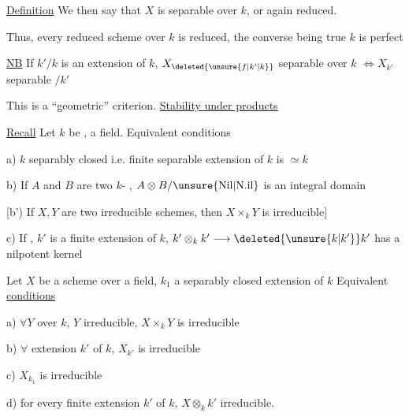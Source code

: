 \uline{Definition} We then say that $X$ is separable over $k$, or again   reduced.

Thus,  every  reduced scheme over $k$ is  reduced, the converse being true  $k$ is perfect

\uline{NB} If $k'/k$ is an extension of $k$, $X_{\deleted{\unsure{f|k'|k}}}$ separable over $k$ $\Longleftrightarrow X_{k'}$ separable $/k'$

This is a ``geometric'' criterion. \hfill\uline{Stability under products}


\uline{Recall} Let $k$ be , a field. Equivalent conditions

a) $k$ separably closed i.e.  finite separable extension of $k$ is $\simeq k$

b) If $A$ and $B$ are two $k$- , $A\otimes B/\mathrm{\unsure{Nil|N.il}}$ is an integral domain

[b') If $X,Y$ are two irreducible schemes, then $X\times_k Y$ is irreducible]

c) If , $k'$ is a finite extension of $k$, $k'\otimes_k k'\longrightarrow\deleted{\unsure{k|k'}}k'$ has a nilpotent kernel


Let $X$ be a scheme over a field, $k_1$ a separably closed extension of $k$ Equivalent \uline{conditions}

a) $\forall Y$ over $k$, $Y$ irreducible, $X\times_k Y$ is irreducible

b) $\forall$ extension $k'$ of $k$, $X_{k'}$ is irreducible

c) $X_{k_1}$ is irreducible

d) for every finite  extension $k'$ of $k$, $X\otimes_k k'$ irreducible.


